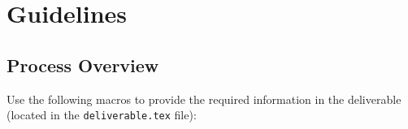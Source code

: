
\clearpage
\section{Guidelines}
\label{sec:guidelines}

\subsection{Process Overview}
\label{sec:latex-style-files}

\newcommand{\macro}[1]{{\tt \textbackslash #1}}

Use the following macros to provide the required information in the deliverable (located in the \texttt{deliverable.tex} file):


